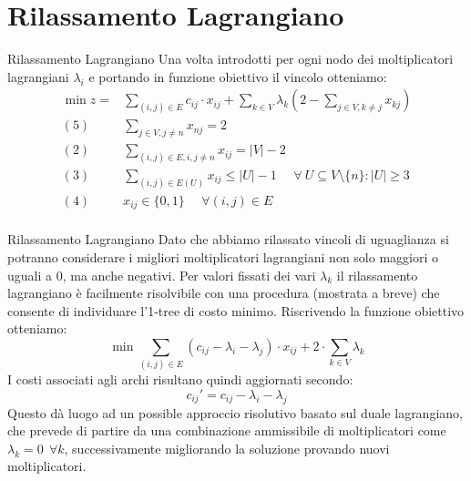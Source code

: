 \documentclass[10pt]{beamer}
\begin{document}
\section{Rilassamento Lagrangiano}
\begin{frame}{Rilassamento Lagrangiano}
    Una volta introdotti per ogni nodo dei moltiplicatori lagrangiani $\lambda_i$ e portando in funzione obiettivo il vincolo otteniamo:
    \begin{equation*}
        \begin{split}
             \min z = & \sum_{(i,j) \in E} c_{ij} \cdot x_{ij} + \sum_{k\in V} \lambda_k (2 - \sum_{j\in V, k\neq j} x_{kj})\\
            (5)\:\:\:\:\:\: & \sum_{j \in V, j \neq n} x_{nj} = 2 \\
            (2) \:\:\:\:\:\: & \sum_{(i,j)\in E, i, j \neq n} x_{ij} = |V|-2 \\
            (3) \:\:\:\:\:\: & \sum_{(i,j) \in E(U)} x_{ij} \leq |U| - 1 \:\:\:\:\:\: \forall\: U \subseteq V\setminus\{n\} : |U| \geq 3 \\
            (4) \:\:\:\:\:\: & x_{ij} \in \{0,1\} \:\:\:\:\:\: \forall (i,j) \in E\\
        \end{split}
    \end{equation*}
\end{frame}

\begin{frame}{Rilassamento Lagrangiano}
    Dato che abbiamo rilassato vincoli di uguaglianza si potranno considerare i migliori moltiplicatori lagrangiani non solo maggiori o uguali a 0, ma anche negativi. Per valori fissati dei vari $\lambda_k$ il rilassamento lagrangiano è facilmente risolvibile con una procedura (mostrata a breve) che consente di individuare l'1-tree di costo minimo.
    \newline
    \newline
    Riscrivendo la funzione obiettivo otteniamo:
    \begin{equation*}
         \min \sum_{(i,j)\in E} ( c_{ij} - \lambda_i - \lambda_j) \cdot x_{ij} + 2 \cdot \sum_{k \in V} \lambda_k
    \end{equation*}
    I costi associati agli archi risultano quindi aggiornati secondo:
    \begin{equation*}
        c_{ij}' = c_{ij} - \lambda_i - \lambda_j
    \end{equation*}
    Questo dà luogo ad un possible approccio risolutivo basato sul duale lagrangiano, che prevede di partire da una combinazione ammissibile di moltiplicatori come $\lambda_k = 0\:\: \forall k$, successivamente migliorando la soluzione provando nuovi moltiplicatori.
\end{frame}
\end{document}
